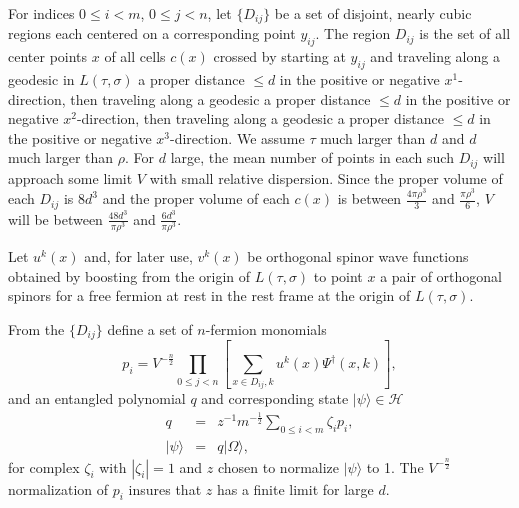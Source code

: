\documentclass[twocolumn,amsmath,amssymb]{revtex4-1}
\begin{document}
For indices $0 \leq i < m $, $0 \leq j < n$, let $\{ D_{ij} \}$ be a set of 
disjoint, nearly cubic regions each centered on a
corresponding point $y_{ij}$. 
The region $D_{ij}$ is the set of all center points $x$ of all cells $c(x)$
crossed by starting at $y_{ij}$ and traveling along a geodesic in $L(\tau, \sigma)$
a proper distance $\le d$ in the positive or negative $x^1$-direction,
then traveling along a geodesic a proper distance $\le d$ in the positive or negative $x^2$-direction,
then traveling along a geodesic a proper distance $\le d$ in the positive or negative $x^3$-direction.
We assume $\tau$ much larger than $d$ and $d$ much larger than $\rho$.
For $d$ large, the mean number of points in each such $D_{ij}$ will approach some limit $V$
with small relative dispersion. Since the proper volume of each $D_{ij}$ is $8 d^3$ and the
proper volume of each $c(x)$ is between $\frac{4 \pi \rho^3}{3}$ and $\frac{\pi \rho^3}{6}$, $V$
will be between $\frac{48 d^3}{\pi \rho^3}$ and $\frac{ 6 d^3}{\pi \rho^3}$.


Let $u^k(x)$ and, for later use, $v^k(x)$ be orthogonal
spinor wave functions obtained by boosting from
the origin of $L(\tau, \sigma)$ to point $x$
a pair of orthogonal spinors for
a free fermion at rest in the rest frame at the origin of $L(\tau, \sigma)$.

From the $\{ D_{ij} \}$ define a set of $n$-fermion monomials
\begin{equation}
\label{pstatesr}
p_i =  
V^{-\frac{n}{2}}\prod_{0 \le j <n} \left[\sum_{x \in D_{ij},k} u^k(x) \Psi^\dagger( x,k )\right], 
\end{equation}
and an entangled polynomial $q$ and corresponding state $|\psi \rangle  \in \mathcal{H}$
\begin{subequations}
\begin{eqnarray}
\label{entangledstater}
q &=& z^{-1} m^{-\frac{1}{2}}\sum_{0 \le i < m} \zeta_i p_i, \\
\label{entangledstater1}
|\psi \rangle  & = & q|\Omega \rangle ,
\end{eqnarray}
\end{subequations}
for complex $\zeta_i$ with $| \zeta_i| = 1$ and $z$ chosen to normalize $|\psi \rangle $ to 1.
The $V^{-\frac{n}{2}}$ normalization of $p_i$ insures that $z$ has a finite limit for large $d$.
\end{document}
